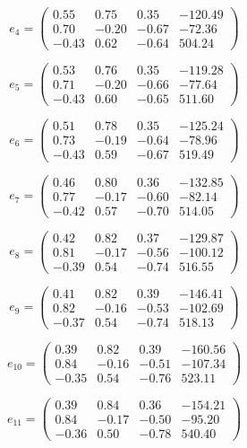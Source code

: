 \documentclass[a4paper,12pt]{article}
\begin{document}
{\[
e_4 = \begin{pmatrix}
0.55 & 0.75 & 0.35 & -120.49 \\
0.70 & -0.20 & -0.67 & -72.36 \\
-0.43 & 0.62 & -0.64 & 504.24
\end{pmatrix}
\]

\[
e_5 = \begin{pmatrix}
0.53 & 0.76 & 0.35 & -119.28 \\
0.71 & -0.20 & -0.66 & -77.64 \\
-0.43 & 0.60 & -0.65 & 511.60
\end{pmatrix}
\]

\[
e_6 = \begin{pmatrix}
0.51 & 0.78 & 0.35 & -125.24 \\
0.73 & -0.19 & -0.64 & -78.96 \\
-0.43 & 0.59 & -0.67 & 519.49
\end{pmatrix}
\]

\[
e_7 = \begin{pmatrix}
0.46 & 0.80 & 0.36 & -132.85 \\
0.77 & -0.17 & -0.60 & -82.14 \\
-0.42 & 0.57 & -0.70 & 514.05
\end{pmatrix}
\]

\[
e_8 = \begin{pmatrix}
0.42 & 0.82 & 0.37 & -129.87 \\
0.81 & -0.17 & -0.56 & -100.12 \\
-0.39 & 0.54 & -0.74 & 516.55
\end{pmatrix}
\]

\[
e_9 = \begin{pmatrix}
0.41 & 0.82 & 0.39 & -146.41 \\
0.82 & -0.16 & -0.53 & -102.69 \\
-0.37 & 0.54 & -0.74 & 518.13
\end{pmatrix}
\]

\[
e_{10} = \begin{pmatrix}
0.39 & 0.82 & 0.39 & -160.56 \\
0.84 & -0.16 & -0.51 & -107.34 \\
-0.35 & 0.54 & -0.76 & 523.11
\end{pmatrix}
\]

\[
e_{11} = \begin{pmatrix}
0.39 & 0.84 & 0.36 & -154.21 \\
0.84 & -0.17 & -0.50 & -95.20 \\
-0.36 & 0.50 & -0.78 & 540.40
\end{pmatrix}
\]

}
\end{document}
